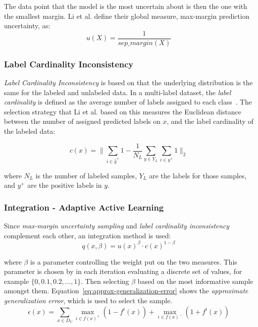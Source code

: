 The data point that the model is the most uncertain about is then the one with the smallest margin.
Li et al\@. define their global measure, max-margin prediction uncertainty, as:
\begin{equation}
    u(X) = \frac{1}{sep\_margin(X)}
\end{equation}

\subsubsection{Label Cardinality Inconsistency}

\textit{Label Cardinality Inconsistency} is based on that the underlying distribution is the same for the labeled and unlabeled data.
In a multi-label dataset, the \textit{label cardinality} is defined as the average number of labels assigned to each class~\cite{tsoumakas2006multi}.
The selection strategy that Li et al\@. based on this measures the Euclidean distance between the number of assigned predicted labels on $x$, and the label cardinality of the labeled data:

\begin{equation}
    c(x) = \bigg \lVert \sum_{i \in \hat{y}^+} 1 - \frac{1}{N_L} \sum_{y \in Y_L} \sum_{i \in y^+} 1 \bigg \rVert_2
\end{equation}

where $N_L$ is the number of labeled samples, $Y_L$ are the labels for those samples, and $y^+$ are the positive labels in $y$.

\subsubsection{Integration - Adaptive Active Learning}

Since \textit{max-margin uncertainty sampling} and \textit{label cardinality inconsistency} complement each other, an integration method is used:
\begin{equation}\label{eq:approx-generalization-error}
    q(x, \beta) = u(x)^\beta \cdot c(x)^{1-\beta}
\end{equation}

where $\beta$ is a parameter controlling the weight put on the two measures.
This parameter is chosen by in each iteration evaluating a discrete set of values, for example $\{0, 0.1, 0.2, \dots, 1\}$.
Then selecting $\beta$ based on the most informative sample amongst them.
Equation~\ref{eq:approx-generalization-error} shows the \textit{approximate generalization error}, which is used to select the sample.
\begin{equation}
    \epsilon(x) = \sum_{x \in D_U} \max_{i \in f(x)^+}(1-f^i(x)) + \max_{i \in f(x)^-}(1+f^i(x))
\end{equation}

